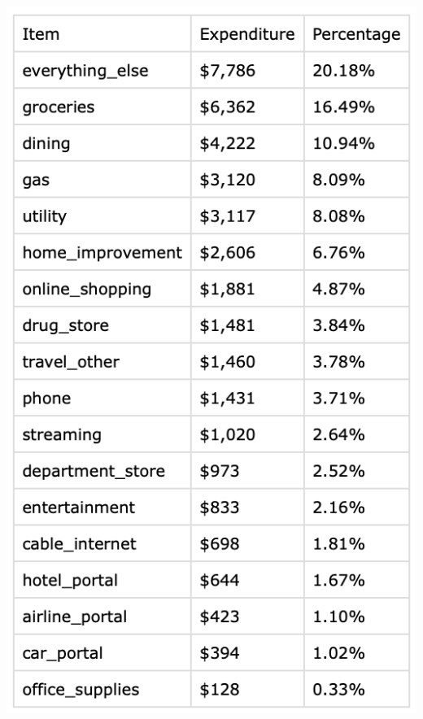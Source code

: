 \begin{frame}
\begin{columns}[c]
\begin{column}{0.3\textwidth}
        \includegraphics[width=1.0\textwidth]{../Misc/Budget.png}
        \end{column}
    \end{columns}
\end{frame}    

